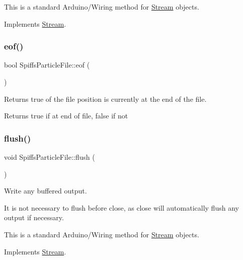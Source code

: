 This is a standard Arduino/\+Wiring method for \mbox{\hyperlink{class_stream}{Stream}} objects. 

Implements \mbox{\hyperlink{class_stream_a9c98a763395005c08ce95afb2f06c7b1}{Stream}}.

\mbox{\label{class_spiffs_particle_file_adc5b9b4d2447c8a3f1a63b40fd80e56f}} 
\subsubsection{\texorpdfstring{eof()}{eof()}}
{\footnotesize\ttfamily bool Spiffs\+Particle\+File\+::eof (\begin{DoxyParamCaption}{ }\end{DoxyParamCaption})\hspace{0.3cm}{\ttfamily [inline]}}



Returns true of the file position is currently at the end of the file. 

\begin{DoxyReturn}{Returns}
true if at end of file, false if not 
\end{DoxyReturn}
\mbox{\label{class_spiffs_particle_file_a25a803a411c55fe0ddf1c5d2576d8055}} 
\subsubsection{\texorpdfstring{flush()}{flush()}}
{\footnotesize\ttfamily void Spiffs\+Particle\+File\+::flush (\begin{DoxyParamCaption}{ }\end{DoxyParamCaption})\hspace{0.3cm}{\ttfamily [virtual]}}



Write any buffered output. 

It is not necessary to flush before close, as close will automatically flush any output if necessary.

This is a standard Arduino/\+Wiring method for \mbox{\hyperlink{class_stream}{Stream}} objects. 

Implements \mbox{\hyperlink{class_stream_aa3ef2c34f152a0b2ea8de9139b9461da}{Stream}}.

